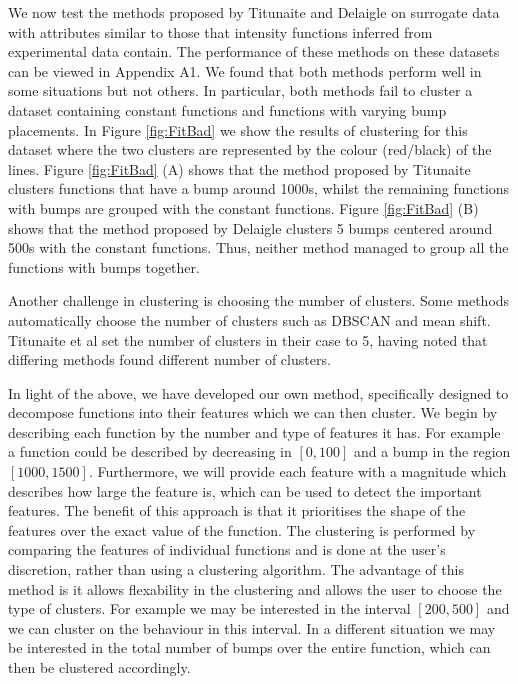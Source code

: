 \documentclass[../main.tex]{subfiles}
\begin{document}
 We now test the methods proposed by Titunaite \cite{Tilunaite_2017} and Delaigle \cite{Delaigle_2019} on surrogate data with attributes similar to those that intensity functions inferred from experimental data contain. The performance of these methods on these datasets can be viewed in Appendix $\text{}$A1. We found that both methods perform well in some situations but not others. In particular, both methods fail to cluster a dataset containing constant functions and functions with varying bump placements. In Figure \ref{fig:FitBad} we show the results of clustering for this dataset where the two clusters are represented by the colour (red/black) of the lines. Figure \ref{fig:FitBad} (A) shows that the method proposed by Titunaite clusters functions that have a bump around 1000s, whilst the remaining functions with bumps are grouped with the constant functions. Figure \ref{fig:FitBad} (B) shows that the method proposed by Delaigle clusters 5 bumps centered around 500s with the constant functions. Thus, neither method managed to group all the functions with bumps together. 
 
 Another challenge in clustering is choosing the number of clusters. Some methods automatically choose the number of clusters such as DBSCAN and mean shift. Titunaite et al \cite{Tilunaite_2017} set the number of clusters in their case to 5, having noted that differing methods found different number of clusters.   
 
 In light of the above, we have developed our own method, specifically designed to decompose functions into their features which we can then cluster. We begin by describing each function by the number and type of features it has. For example a function could be described by decreasing in $[0,100]$ and a bump in the region $[1000,1500]$. Furthermore, we will provide each feature with a magnitude which describes how large the feature is, which can be used to detect the important features. The benefit of this approach is that it prioritises the shape of the features over the exact value of the function. 
 The clustering is performed by comparing the features of individual functions and is done at the user's discretion, rather than using a clustering algorithm. The advantage of this method is it allows flexability in the clustering and allows the user to choose the type of clusters. For example we	 may be interested in the interval $[200,500]$ and we can cluster on the behaviour in this interval. In a different situation we may be interested in the total number of bumps over the entire function, which can then be clustered accordingly. 
 
\end{document}
